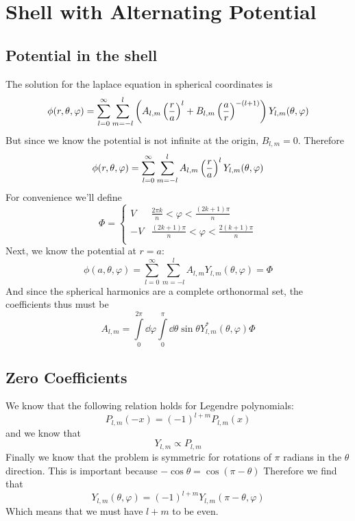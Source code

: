 \clearpage
\section{Shell with Alternating Potential}
\subsection{Potential in the shell}
The solution for the laplace equation in spherical coordinates is
\begin{equation}
  \phi(r,\theta,\varphi)=\sum_{l=0}^{\infty}\sum_{m=-l}^l\left(A_{l,m}\left(\frac{r}{a}\right)^l+B_{l,m}\left(\frac{a}{r}\right)^{-(l+1)}\right)Y_{l,m}(\theta,\varphi)
\end{equation}
But since we know the potential is not infinite at the origin, \(B_{l,m}=0\). Therefore
\begin{equation}
  \phi(r,\theta,\varphi)=\sum_{l=0}^{\infty}\sum_{m=-l}^l A_{l,m}\left(\frac{r}{a}\right)^lY_{l,m}(\theta,\varphi)
\end{equation}
For convenience we'll define
\begin{equation}
  \Phi = \begin{cases}
  	V & \frac{2\pi k}{n} < \varphi < \frac{(2k+1)\pi}{n}\\
  	-V & \frac{(2k+1)\pi}{n} < \varphi < \frac{2(k+1)\pi}{n}\\
  \end{cases}
\end{equation}
Next, we know the potential at $r=a$:
\begin{equation}
  \phi(a,\theta,\varphi)=\sum\limits_{l=0}^\infty\sum\limits_{m=-l}^lA_{l,m}Y_{l,m}(\theta,\varphi)= \Phi
\end{equation}
And since the spherical harmonics are a complete orthonormal set, the coefficients thus must be
\begin{equation}
  A_{l,m}=\int\limits_0^{2\pi}\dd \varphi\int\limits_0^\pi \dd\theta\sin\theta Y^*_{l,m}(\theta,\varphi)\Phi
\end{equation}
\subsection{Zero Coefficients}
We know that the following relation holds for Legendre polynomials:
\begin{equation}
  P_{l,m}(-x)={(-1)}^{l+m}P_{l,m}(x)
\end{equation}
and we know that
\begin{equation}
  Y_{l,m} \propto P_{l,m}
\end{equation}
Finally we know that the problem is symmetric for rotations of \(\pi\) radians in the \(\theta\) direction. This is important because $-\cos\theta=\cos(\pi-\theta)$
Therefore we find that
\begin{equation}
  Y_{l,m}(\theta,\varphi)={(-1)}^{l+m}Y_{l,m}(\pi-\theta,\varphi)
\end{equation}
Which means that we must have \(l+m\) to be even.
